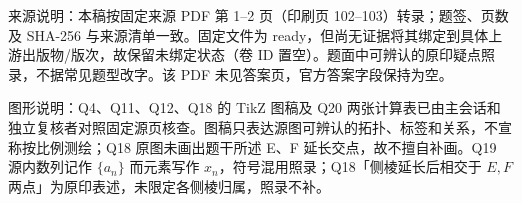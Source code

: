 

\begin{gktip}
来源说明：本稿按固定来源 PDF 第 1–2 页（印刷页 102–103）转录；题签、页数及 SHA-256 与来源清单一致。固定文件为 ready，但尚无证据将其绑定到具体上游出版物/版次，故保留未绑定状态（卷 ID 置空）。题面中可辨认的原印疑点照录，不据常见题型改字。该 PDF 未见答案页，官方答案字段保持为空。

图形说明：Q4、Q11、Q12、Q18 的 TikZ 图稿及 Q20 两张计算表已由主会话和独立复核者对照固定源页核查。图稿只表达源图可辨认的拓扑、标签和关系，不宣称按比例测绘；Q18 原图未画出题干所述 E、F 延长交点，故不擅自补画。Q19 源内数列记作 $\{a_n\}$ 而元素写作 $x_n$，符号混用照录；Q18「侧棱延长后相交于 $E,F$ 两点」为原印表述，未限定各侧棱归属，照录不补。
\end{gktip}


